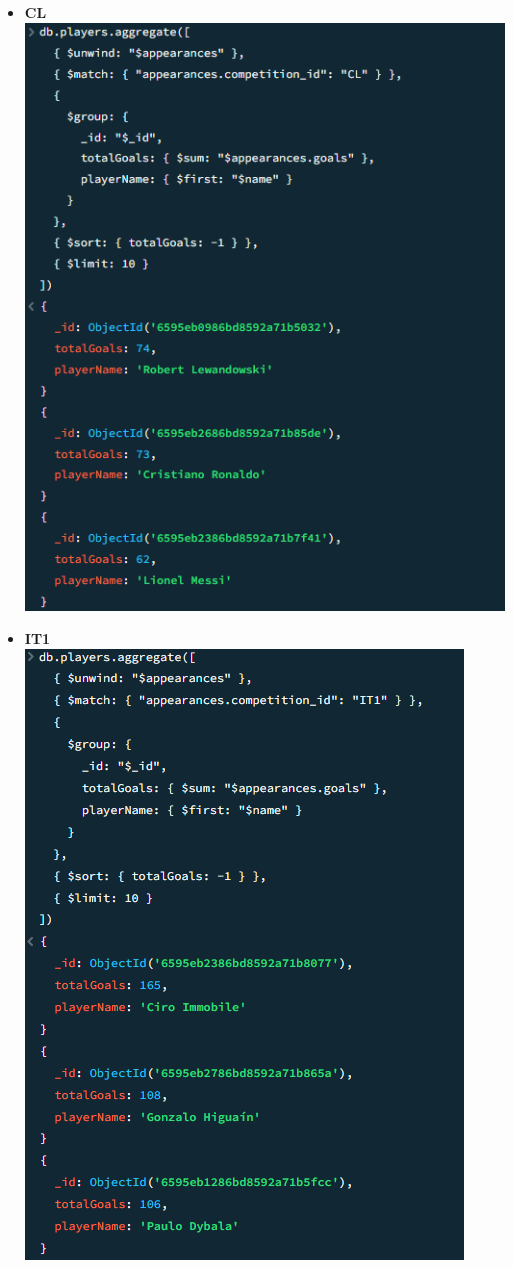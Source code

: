 \documentclass{Configuration_Files/PoliMi3i_thesis}
\begin{document}
\begin{itemize}
    \item \textbf{CL}\\
        \includegraphics[scale=0.8]{Images/Queries/Competitions_statistics/top_goalscorers/CL.png}
    \item \textbf{IT1}\\
    \includegraphics[scale=0.8]{Images/Queries/Competitions_statistics/top_goalscorers/IT1.png}

\end{itemize}
\end{document}
